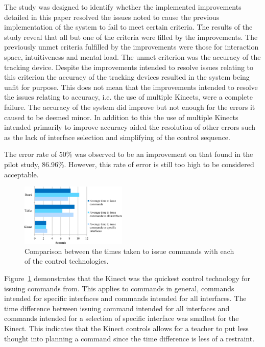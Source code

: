 \documentclass[link]{IWCOMP}
\begin{document}
The study was designed to identify whether the implemented improvements detailed in this paper resolved the issues noted to cause the previous implementation of the system to fail to meet certain criteria.
The results of the study reveal that all but one of the criteria were filled by the improvements.
The previously unmet criteria fulfilled by the improvements were those for interaction space, intuitiveness and mental load.
The unmet criterion was the accuracy of the tracking device.
Despite the improvements intended to resolve issues relating to this criterion the accuracy of the tracking devices resulted in the system being unfit for purpose.
This does not mean that the improvements intended to resolve the issues relating to accuracy, i.e. the use of multiple Kinects, were a complete failure.
The accuracy of the system did improve but not enough for the errors it caused to be deemed minor.
In addition to this the use of multiple Kinects intended primarily to improve accuracy aided the resolution of other errors such as the lack of interface selection and simplifying of the control sequence.

The error rate of 50\% was observed to be an improvement on that found in the pilot study, 86.96\%.
However, this rate of error is still too high to be considered acceptable.

\begin{figure}[h]
  \centering
  \includegraphics[width=0.45\textwidth]{figures/bar_chart_times.png}
  \caption{Comparison between the times taken to issue commands with each of the control technologies.}
  \label{fig:controlDevicesTimes}
\end{figure}

Figure~\ref{fig:controlDevicesTimes} demonstrates that the Kinect was the quickest control technology for issuing commands from.
This applies to commands in general, commands intended for specific interfaces and commands intended for all interfaces.
The time difference between issuing command intended for all interfaces and commands intended for a selection of specific interface was smallest for the Kinect.
This indicates that the Kinect controls allows for a teacher to put less thought into planning a command since the time difference is less of a restraint.
\end{document}
